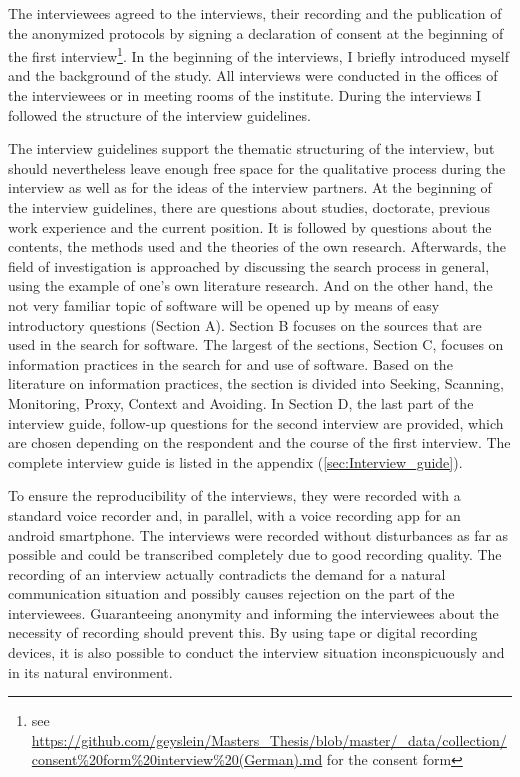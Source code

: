 \documentclass[12pt, a4paper, titlepage, oneside, abstract=true, toc=listof, toc=bibliography]{scrreprt}
\begin{document}
The interviewees agreed to the interviews, their recording and the publication of the anonymized protocols by signing a declaration of consent at the beginning of the first interview\footnote{see \url{https://github.com/geyslein/Masters_Thesis/blob/master/_data/collection/consent\%20form\%20interview\%20(German).md} for the consent form}. In the beginning of the interviews, I briefly introduced myself and the background of the study. All interviews were conducted in the offices of the interviewees or in meeting rooms of the institute. During the interviews I followed the structure of the interview guidelines.

The interview guidelines support the thematic structuring of the interview, but should nevertheless leave enough free space for the qualitative process during the interview as well as for the ideas of the interview partners. At the beginning of the interview guidelines, there are questions about studies, doctorate, previous work experience and the current position. It is followed by questions about the contents, the methods used and the theories of the own research. Afterwards, the field of investigation is approached by discussing the search process in general, using the example of one's own literature research. And on the other hand, the not very familiar topic of software will be opened up by means of easy introductory questions (Section A).  Section B focuses on the sources that are used in the search for software. The largest of the sections, Section C, focuses on information practices in the search for and use of software. Based on the literature on information practices, the section is divided into Seeking, Scanning, Monitoring, Proxy, Context and Avoiding. In Section D, the last part of the interview guide, follow-up questions for the second interview are provided, which are chosen depending on the respondent and the course of the first interview. The complete interview guide is listed in the appendix (\ref{sec:Interview_guide}).

To ensure the reproducibility of the interviews, they were recorded with a standard voice recorder and, in parallel, with a voice recording app for an android smartphone. The interviews were recorded without disturbances as far as possible and could be transcribed completely due to good recording quality. The recording of an interview actually contradicts the demand for a natural communication situation and possibly causes rejection on the part of the interviewees. Guaranteeing anonymity and informing the interviewees about the necessity of recording should prevent this. By using tape or digital recording devices, it is also possible to conduct the interview situation inconspicuously and in its natural environment.
\end{document}
